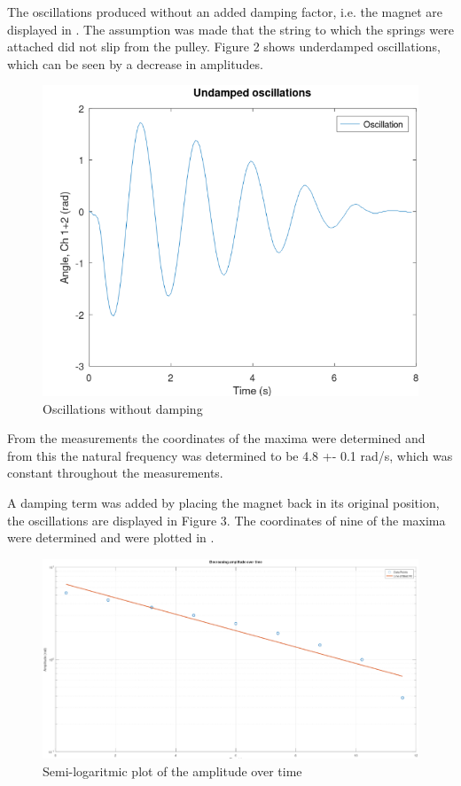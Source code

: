 The oscillations produced without an added damping factor, i.e. the magnet are displayed in \label{fig:undamped oscillations}. The assumption was made that the string to which the springs were attached did not slip from the pulley. Figure 2 shows underdamped oscillations, which can be seen by a decrease in amplitudes.

\begin{figure}[h!]
  \centering
  \includegraphics[width=1\textwidth]{oscillations/images/Undamped Oscillations}
  \caption{Oscillations without damping}
  \label{fig:undamped oscillations}
\end{figure}

From the measurements the coordinates of the maxima were determined and from this the natural frequency was determined to be 4.8 +- 0.1 rad/s, which was constant throughout the measurements.

A damping term was added by placing the magnet back in its original position, the oscillations are displayed in Figure 3. The coordinates of nine of the maxima were determined and were plotted in \label{log of damping factor}. 

\begin{figure}[h!]
  \centering
  \includegraphics[width=1\textwidth]{oscillations/images/Log of damping factor}
  \caption{Semi-logaritmic plot of the amplitude over time}
  \label{log of damping factor}
\end{figure}

